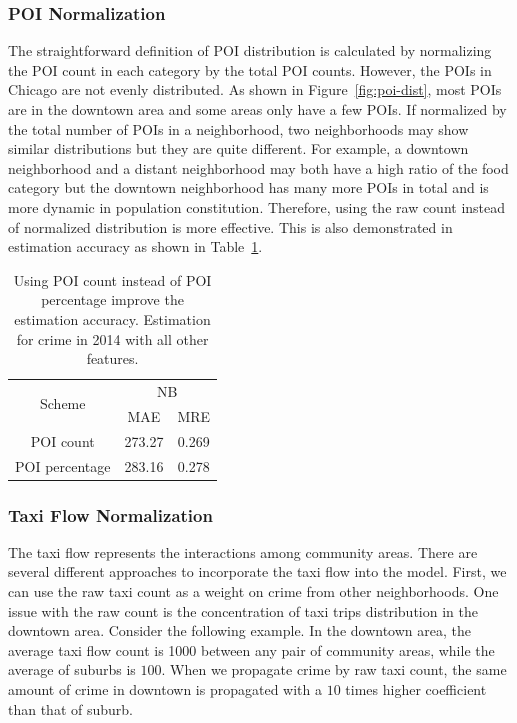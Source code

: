 \vfill\eject
\subsubsection{POI Normalization}
The straightforward definition of POI distribution is calculated by normalizing the POI count in each category by the total POI counts. However, the POIs in Chicago are not evenly distributed. As shown in Figure~\ref{fig:poi-dist}, most POIs are in the downtown area and some areas only have a few POIs. If normalized by the total number of POIs in a neighborhood, two neighborhoods may show similar distributions but they are quite different. For example, a downtown neighborhood and a distant neighborhood may both have a high ratio of the food category but the downtown neighborhood has many more POIs in total and is more dynamic in population constitution. Therefore, using the raw count instead of normalized distribution is more effective. This is also demonstrated in estimation accuracy as shown in Table~\ref{tb:poi-norm}. 

\begin{table}[h]
\centering
\caption{Using POI count instead of POI percentage improve the estimation accuracy. Estimation for crime in 2014 with all other features.}
\vspace{2mm}
\label{tb:poi-norm}
\begin{tabular}{|c|c|c|}
\hline
\multirow{2}{*}{Scheme} & \multicolumn{2}{|c|}{NB} \\ \cline{2-3}
	& MAE & MRE \\ \hline
POI count & 273.27& 0.269  \\ \hline
POI percentage &283.16  & 0.278\\ \hline
\end{tabular}
\end{table}




\subsubsection{Taxi Flow Normalization}
The taxi flow represents the interactions among community areas. There are several different approaches to incorporate the taxi flow into the model.  First, we can use the raw taxi count as a weight on crime from other neighborhoods. One issue with the raw count is the concentration of taxi trips distribution in the downtown area. Consider the following example. In the downtown area, the average taxi flow count is \num{1000} between any pair of community areas, while the average of suburbs is $100$. When we propagate crime by raw taxi count, the same amount of crime in downtown is propagated with a  $10$ times higher coefficient than that of suburb. 


